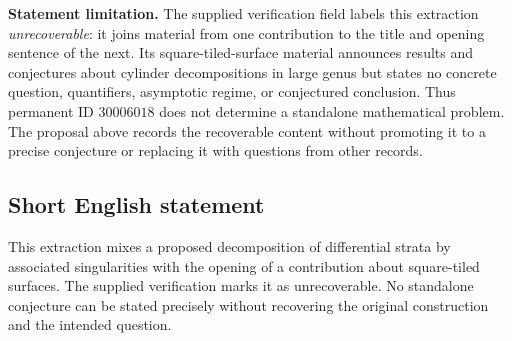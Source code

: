 \documentclass[11pt]{article}
\begin{document}
\textbf{Statement limitation.} The supplied verification field labels this extraction \emph{unrecoverable}: it joins material from one contribution to the title and opening sentence of the next. Its square-tiled-surface material announces results and conjectures about cylinder decompositions in large genus but states no concrete question, quantifiers, asymptotic regime, or conjectured conclusion. Thus permanent ID \(30006018\) does not determine a standalone mathematical problem. The proposal above records the recoverable content without promoting it to a precise conjecture or replacing it with questions from other records.
\subsection{Short English statement}
This extraction mixes a proposed decomposition of differential strata by associated singularities with the opening of a contribution about square-tiled surfaces. The supplied verification marks it as unrecoverable. No standalone conjecture can be stated precisely without recovering the original construction and the intended question.
\end{document}
